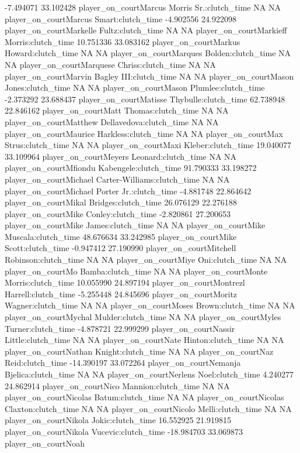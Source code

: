 \documentclass[
  landscape]{article}
\begin{document}
-7.494071 33.102428 player\_on\_courtMarcus Morris Sr.:clutch\_time NA
NA player\_on\_courtMarcus Smart:clutch\_time -4.902556 24.922098
player\_on\_courtMarkelle Fultz:clutch\_time NA NA
player\_on\_courtMarkieff Morris:clutch\_time 10.751336 33.083162
player\_on\_courtMarkus Howard:clutch\_time NA NA
player\_on\_courtMarques Bolden:clutch\_time NA NA
player\_on\_courtMarquese Chriss:clutch\_time NA NA
player\_on\_courtMarvin Bagley III:clutch\_time NA NA
player\_on\_courtMason Jones:clutch\_time NA NA player\_on\_courtMason
Plumlee:clutch\_time -2.373292 23.688437 player\_on\_courtMatisse
Thybulle:clutch\_time 62.738948 22.846162 player\_on\_courtMatt
Thomas:clutch\_time NA NA player\_on\_courtMatthew
Dellavedova:clutch\_time NA NA player\_on\_courtMaurice
Harkless:clutch\_time NA NA player\_on\_courtMax Strus:clutch\_time NA
NA player\_on\_courtMaxi Kleber:clutch\_time 19.040077 33.109964
player\_on\_courtMeyers Leonard:clutch\_time NA NA
player\_on\_courtMfiondu Kabengele:clutch\_time 91.790333 33.198272
player\_on\_courtMichael Carter-Williams:clutch\_time NA NA
player\_on\_courtMichael Porter Jr.:clutch\_time -4.881748 22.864642
player\_on\_courtMikal Bridges:clutch\_time 26.076129 22.276188
player\_on\_courtMike Conley:clutch\_time -2.820861 27.200653
player\_on\_courtMike James:clutch\_time NA NA player\_on\_courtMike
Muscala:clutch\_time 48.676634 33.242985 player\_on\_courtMike
Scott:clutch\_time -0.947412 27.190990 player\_on\_courtMitchell
Robinson:clutch\_time NA NA player\_on\_courtMiye Oni:clutch\_time NA NA
player\_on\_courtMo Bamba:clutch\_time NA NA player\_on\_courtMonte
Morris:clutch\_time 10.055990 24.897194 player\_on\_courtMontrezl
Harrell:clutch\_time -5.255448 24.845696 player\_on\_courtMoritz
Wagner:clutch\_time NA NA player\_on\_courtMoses Brown:clutch\_time NA
NA player\_on\_courtMychal Mulder:clutch\_time NA NA
player\_on\_courtMyles Turner:clutch\_time -4.878721 22.999299
player\_on\_courtNassir Little:clutch\_time NA NA player\_on\_courtNate
Hinton:clutch\_time NA NA player\_on\_courtNathan Knight:clutch\_time NA
NA player\_on\_courtNaz Reid:clutch\_time -14.390197 33.072264
player\_on\_courtNemanja Bjelica:clutch\_time NA NA
player\_on\_courtNerlens Noel:clutch\_time 4.240277 24.862914
player\_on\_courtNico Mannion:clutch\_time NA NA
player\_on\_courtNicolas Batum:clutch\_time NA NA
player\_on\_courtNicolas Claxton:clutch\_time NA NA
player\_on\_courtNicolo Melli:clutch\_time NA NA player\_on\_courtNikola
Jokic:clutch\_time 16.552925 21.919815 player\_on\_courtNikola
Vucevic:clutch\_time -18.984703 33.069873 player\_on\_courtNoah
\end{document}
